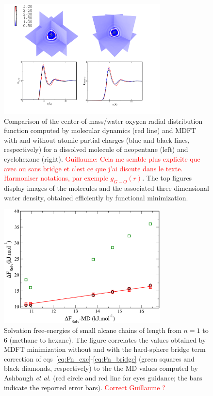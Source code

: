 \documentclass[aip,jcp,preprint]{revtex4-1}
\begin{document}
\begin{figure}
    \includegraphics[width=8.5cm]{cyclo_neo_all.pdf}
    \caption{
        \label{fig:gr_cyclohexane_neopentane}
        Comparison of the center-of-mass/water oxygen radial distribution function computed by molecular dynamics (red line) and MDFT
        with and without atomic partial charges (blue and black lines, respectively) for a dissolved molecule of neopentane (left) and cyclohexane (right). \textcolor{red}{Guillaume: Cela me semble plus explicite que avec ou sans bridge et c'est ce que j'ai discute dans le texte. Harmoniser notations, par exemple  $g_{G-O}(r)$}. The top figures display images of the molecules and the associated three-dimensional water density, obtained efficiently by functional minimization.
        }
\end{figure}

\begin{figure}
    \includegraphics[width=8.5cm]{enercomp_alcanes_MD_MDFT.pdf}
    \caption{
        \label{fig:free_energies_alcanes}
        Solvation free-energies of small alcane chains of length from $n=1$ to 6 (methane to hexane). The figure correlates the values obtained by MDFT minimization without and with the hard-sphere bridge term correction of  eqs~\ref{eq:Fn_exc}-\ref{eq:Fn_bridge} (green squares and black diamonds, respectively) to the the MD values computed by Ashbaugh {\em et al.}\cite{ashbaugh_hydration_1998} (red circle and red line for eyes guidance; the bars indicate the reported error bars). \textcolor{red}{Correct Guillaume ?}
        }
\end{figure}
\end{document}
